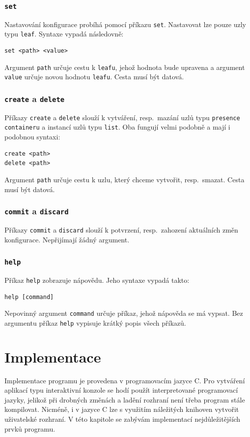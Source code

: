 \documentclass[thesis=B,czech,hidelinks]{FITthesis}[2019/03/06]
\newcommand{\Rplus}{\protect\hspace{-.1em}\protect\raisebox{.35ex}{\smaller{\smaller\textbf{+}}}}
\newcommand{\Cpp}{\mbox{C\Rplus\Rplus}\xspace}
\begin{document}
\subsection{\texttt{set}}
Nastavování konfigurace probíhá pomocí příkazu \texttt{set}. Nastavovat lze pouze uzly typu \texttt{leaf}. Syntaxe vypadá následovně:
\begin{verbatim}
set <path> <value>
\end{verbatim}
Argument \texttt{path} určuje cestu k \texttt{leafu}, jehož hodnota bude upravena a argument \texttt{value} určuje novou hodnotu \texttt{leafu}. Cesta musí být datová.

\subsection{\texttt{create} a \texttt{delete}}
Příkazy \texttt{create} a \texttt{delete} slouží k vytváření, resp.\ mazání uzlů typu \texttt{presence containeru} a instancí uzlů typu \texttt{list}. Oba fungují velmi podobně a mají i podobnou syntaxi:
\begin{verbatim}
create <path>
delete <path>
\end{verbatim}
Argument \texttt{path} určuje cestu k uzlu, který chceme vytvořit, resp.\ smazat. Cesta musí být datová.
\subsection{\texttt{commit} a \texttt{discard}}
Příkazy \texttt{commit} a \texttt{discard} slouží k potvrzení, resp.\ zahození aktuálních změn konfigurace. Nepřijímají žádný argument.
\subsection{\texttt{help}}
Příkaz \texttt{help} zobrazuje nápovědu. Jeho syntaxe vypadá takto:
\begin{verbatim}
help [command]
\end{verbatim}
Nepovinný argument \texttt{command} určuje příkaz, jehož nápověda se má vypsat. Bez argumentu příkaz \texttt{help} vypisuje krátký popis všech příkazů.


\chapter{Implementace}
Implementace programu je provedena v programovacím jazyce \Cpp{}. Pro vytváření aplikací typu interaktivní konzole se hodí použít interpretované programovací jazyky, jelikož při drobných změnách a ladění rozhraní není třeba program stále kompilovat. Nicméně, i v jazyce \Cpp{} lze s využitím náležitých knihoven vytvořit uživatelské rozhraní. V této kapitole se zabývám implementací nejdůležitějších prvků programu.
\end{document}
